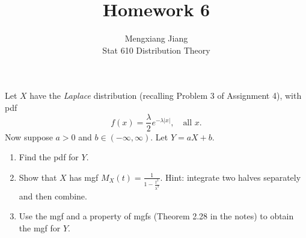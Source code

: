 \documentclass[12pt]{article}
\newenvironment{problem}[2][Problem]{\begin{trivlist}
\item[\hskip \labelsep {\bfseries #1}\hskip \labelsep {\bfseries #2.}]}
{\end{trivlist}}
\begin{document}
 
 
\title{Homework 6}%
\author{Mengxiang Jiang\\ %
Stat 610 Distribution Theory} %
 
\maketitle

\begin{problem}{1}
  Let $X$ have the \textit{Laplace} distribution (recalling Problem 3 
  of Assignment 4), with pdf
  \[
    f(x) = \frac{\lambda}{2} e^{-\lambda |x|}, \quad \text{all } x.
  \]
  Now suppose $a > 0$ and $b \in (-\infty, \infty)$. Let $Y = aX + b$.
  \begin{enumerate}
    \item Find the pdf for $Y$.
    \item Show that $X$ has mgf 
    $M_X(t) = \frac{1}{1 - \frac{t^2}{\lambda^2}}$. Hint: integrate
    two halves separately and then combine.
    \item Use the mgf and a property of mgfs (Theorem 2.28 in the notes)
    to obtain the mgf for $Y$.
  \end{enumerate}


\end{problem}
\end{document}
